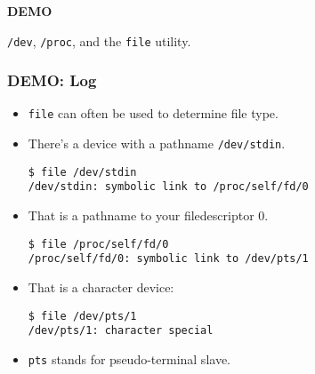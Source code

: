 \begin{frame}

\begin{center}

\Huge \textbf{DEMO}

\bigskip

\large \texttt{/dev}, \texttt{/proc}, and the \texttt{file} utility.

\end{center}


\end{frame}


\begin{frame}[fragile]

\frametitle{DEMO: Log}

\begin{itemize}

\item \texttt{file} can often be used to determine file type.

\item There's a device with a pathname \texttt{/dev/stdin}.

\begin{verbatim}
$ file /dev/stdin
/dev/stdin: symbolic link to /proc/self/fd/0
\end{verbatim}

\item That is a pathname to your filedescriptor 0.

\begin{verbatim}
$ file /proc/self/fd/0
/proc/self/fd/0: symbolic link to /dev/pts/1
\end{verbatim}

\item That is a character device:

\begin{verbatim}
$ file /dev/pts/1 
/dev/pts/1: character special
\end{verbatim}

\item \texttt{pts} stands for pseudo-terminal slave.

\end{itemize}

\end{frame}
